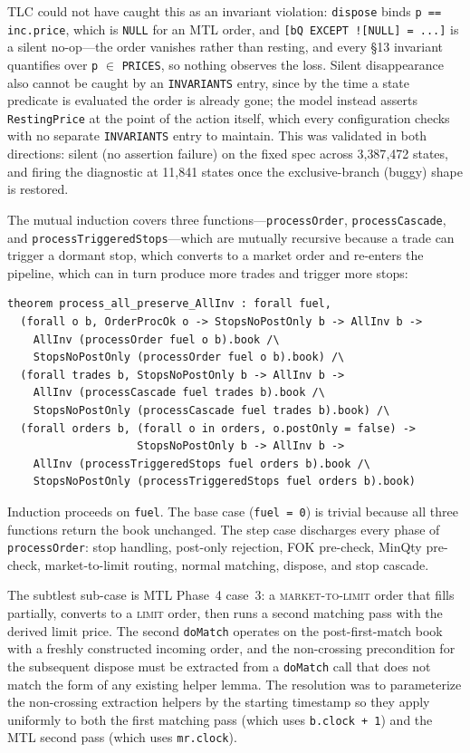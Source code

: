 \documentclass[11pt,a4paper]{article}
\begin{document}
TLC could not have caught this as an invariant violation: \texttt{dispose}
binds \texttt{p == inc.price}, which is \texttt{NULL} for an MTL order,
and \texttt{[bQ EXCEPT ![NULL] = ...]} is a silent no-op---the order
vanishes rather than resting, and every \S13 invariant quantifies over
\texttt{p} $\in$ \texttt{PRICES}, so nothing observes the loss. Silent
disappearance also cannot be caught by an \texttt{INVARIANTS} entry,
since by the time a state predicate is evaluated the order is already
gone; the model instead asserts \texttt{RestingPrice} at the point of
the action itself, which every configuration checks with no separate
\texttt{INVARIANTS} entry to maintain. This was validated in both
directions: silent (no assertion failure) on the fixed spec across
3{,}387{,}472 states, and firing the diagnostic at 11{,}841 states once
the exclusive-branch (buggy) shape is restored.

The mutual induction covers three functions---\texttt{processOrder},
\texttt{processCascade}, and \texttt{processTriggeredStops}---which are
mutually recursive because a trade can trigger a dormant stop, which
converts to a market order and re-enters the pipeline, which can in
turn produce more trades and trigger more stops:

\begin{lstlisting}[language={},basicstyle=\ttfamily\footnotesize]
theorem process_all_preserve_AllInv : forall fuel,
  (forall o b, OrderProcOk o -> StopsNoPostOnly b -> AllInv b ->
    AllInv (processOrder fuel o b).book /\
    StopsNoPostOnly (processOrder fuel o b).book) /\
  (forall trades b, StopsNoPostOnly b -> AllInv b ->
    AllInv (processCascade fuel trades b).book /\
    StopsNoPostOnly (processCascade fuel trades b).book) /\
  (forall orders b, (forall o in orders, o.postOnly = false) ->
                    StopsNoPostOnly b -> AllInv b ->
    AllInv (processTriggeredStops fuel orders b).book /\
    StopsNoPostOnly (processTriggeredStops fuel orders b).book)
\end{lstlisting}

Induction proceeds on \texttt{fuel}. The base case (\texttt{fuel = 0})
is trivial because all three functions return the book unchanged. The
step case discharges every phase of \texttt{processOrder}: stop
handling, post-only rejection, FOK pre-check, MinQty pre-check,
market-to-limit routing, normal matching, dispose, and stop cascade.

The subtlest sub-case is MTL Phase~4 case~3: a
\textsc{market-to-limit} order that fills partially, converts to a
\textsc{limit} order, then runs a second matching pass with the derived
limit price. The second \texttt{doMatch} operates on the post-first-match
book with a freshly constructed incoming order, and the non-crossing
precondition for the subsequent dispose must be extracted from a
\texttt{doMatch} call that does not match the form of any existing
helper lemma. The resolution was to parameterize the non-crossing
extraction helpers by the starting timestamp so they apply uniformly to
both the first matching pass (which uses \texttt{b.clock + 1}) and the
MTL second pass (which uses \texttt{mr.clock}).
\end{document}
